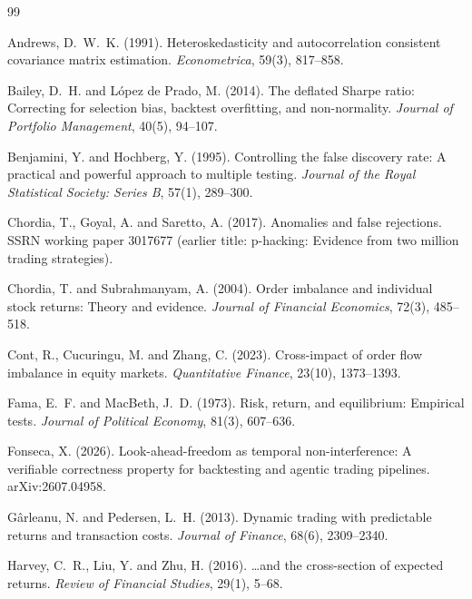 \documentclass[11pt]{article}
\begin{document}
\begin{thebibliography}{99}
\setlength{\itemsep}{0pt}

Andrews, D.\ W.\ K. (1991).
Heteroskedasticity and autocorrelation consistent covariance matrix estimation.
\emph{Econometrica}, 59(3), 817--858.

Bailey, D.\ H. and L\'opez de Prado, M. (2014).
The deflated Sharpe ratio: Correcting for selection bias, backtest overfitting, and non-normality.
\emph{Journal of Portfolio Management}, 40(5), 94--107.

Benjamini, Y. and Hochberg, Y. (1995).
Controlling the false discovery rate: A practical and powerful approach to multiple testing.
\emph{Journal of the Royal Statistical Society: Series B}, 57(1), 289--300.

Chordia, T., Goyal, A. and Saretto, A. (2017).
Anomalies and false rejections.
SSRN working paper 3017677 (earlier title: p-hacking: Evidence from two million trading strategies).

Chordia, T. and Subrahmanyam, A. (2004).
Order imbalance and individual stock returns: Theory and evidence.
\emph{Journal of Financial Economics}, 72(3), 485--518.

Cont, R., Cucuringu, M. and Zhang, C. (2023).
Cross-impact of order flow imbalance in equity markets.
\emph{Quantitative Finance}, 23(10), 1373--1393.

Fama, E.\ F. and MacBeth, J.\ D. (1973).
Risk, return, and equilibrium: Empirical tests.
\emph{Journal of Political Economy}, 81(3), 607--636.

Fonseca, X. (2026).
Look-ahead-freedom as temporal non-interference: A verifiable correctness property for backtesting and agentic trading pipelines.
arXiv:2607.04958.

G\^arleanu, N. and Pedersen, L.\ H. (2013).
Dynamic trading with predictable returns and transaction costs.
\emph{Journal of Finance}, 68(6), 2309--2340.

Harvey, C.\ R., Liu, Y. and Zhu, H. (2016).
\ldots and the cross-section of expected returns.
\emph{Review of Financial Studies}, 29(1), 5--68.


\end{thebibliography}
\end{document}
